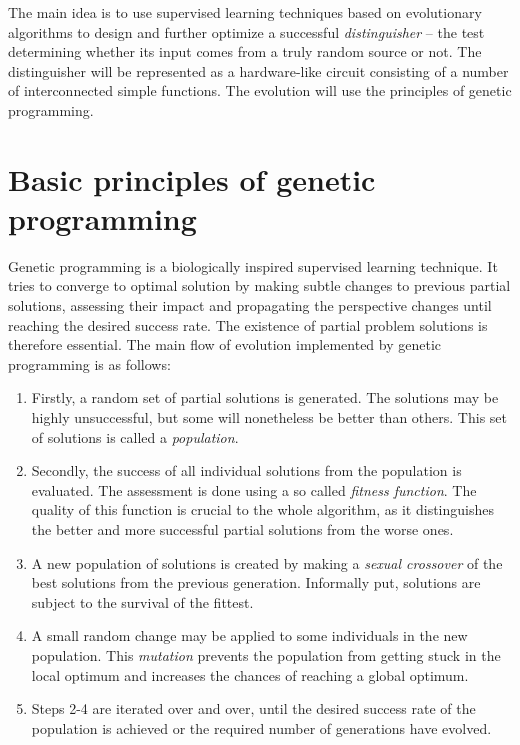 \documentclass[12pt,oneside]{fithesis2}		%
\renewcommand{\_}{\leavevmode \kern0.0em\vbox{\hrule width0.4em}}
\begin{document}
\noindent
The main idea is to use supervised learning techniques based on evolutionary algorithms to design and further 
optimize a successful \textit{distinguisher} -- the test determining whether its input comes from a truly random source or not. 
The distinguisher will be represented as a hardware-like circuit consisting of a number of interconnected simple functions.
The evolution will use the principles of genetic programming.

\section{Basic principles of genetic programming}
\label{sec:basic-ga}

Genetic programming \parencite{genetic-programming} is a biologically inspired supervised learning technique. 
It tries to converge to optimal 
solution by making subtle changes to previous partial solutions, assessing their impact and propagating the perspective changes
until reaching the desired success rate. The existence of partial problem solutions is therefore essential.
The main flow of evolution implemented by genetic programming is as follows:
\begin{enumerate} \rightskip=2em
\item Firstly, a random set of partial solutions is generated. The solutions may be highly unsuccessful,
but some will nonetheless be better than others. This set of solutions is called a \textit{population}.
\item Secondly, the success of all individual solutions from the population is evaluated. The assessment is done using
a so called \textit{fitness function}. The quality of this function is crucial to the whole algorithm, as it
distinguishes the better and more successful partial solutions from the worse ones.
\item A new population of solutions is created by making a \textit{sexual crossover} of the best solutions from the 
previous generation. Informally put, solutions are subject to the survival of the fittest.
\item A small random change may be applied to some individuals in the new population. This \textit{mutation} prevents
the population from getting stuck in the local optimum and increases the chances of reaching a global optimum.
\item Steps 2-4 are iterated over and over, until the desired success rate of the population is achieved or the
required number of generations have evolved.
\end{enumerate}
\end{document}
